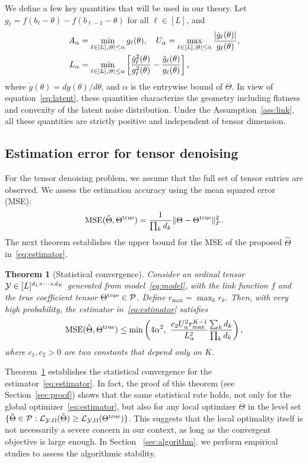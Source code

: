 \documentclass[11pt]{article}
\theoremstyle{plain}
\newtheorem{thm}{Theorem}[section]
\theoremstyle{definition}
\begin{document}
We define a few key quantities that will be used in our theory. Let $g_\ell=f(b_\ell-\theta)-f(b_{\ell-1}-\theta)$ for all $\ell\in[L]$, and
\begin{align}\label{eq:regular}
A_\alpha &= \min_{\ell\in[L], |\theta|\leq \alpha} g_\ell(\theta),\quad  U_\alpha=\max_{\ell\in[L], |\theta|\leq \alpha } {|\dot{g}_\ell(\theta)|\over g_\ell(\theta)},\\
 L_\alpha &= \min_{\ell\in[L], |\theta|\leq \alpha }\left[{\dot{g}_\ell^2 (\theta)\over g_\ell^2(\theta)} -{\ddot{g}_\ell(\theta)\over g_\ell(\theta)}\right],
\end{align}
where $\dot{g}(\theta)=dg(\theta)/d\theta$, and $\alpha$ is the entrywise bound of $\Theta$. In view of equation~\eqref{eq:latent}, these quantities characterize the geometry including flatness and convexity of the latent noise distribution. Under the Assumption~\ref{ass:link}, all these quantities are strictly positive and independent of tensor dimension.

\subsection{Estimation error for tensor denoising}\label{sec:denosing}
For the tensor denoising problem, we assume that the full set of tensor entries are observed. We assess the estimation accuracy using the mean squared error (MSE):
\[
\text{MSE}(\hat \Theta, \Theta^{\mathrm{true}})={1\over \prod_k d_k}\lVert\Theta-\Theta^{\mathrm{true}}\rVert_F^2.
\]
The next theorem establishes the upper bound for the MSE of the proposed $\hat \Theta$ in~\eqref{eq:estimator}.

\begin{thm}[Statistical convergence] \label{thm:rate}
Consider an ordinal tensor $\mathcal{Y}\in[L]^{d_1\times\dots\times d_K}$ generated from model~\eqref{eq:model}, with the link function $f$ and the true coefficient tensor $\Theta^{\mathrm{true}}\in\mathcal{P}$. Define $r_{\max}=\max_k r_k$. Then, with very high probability, the estimator in~\eqref{eq:estimator} satisfies
\begin{equation}\label{eq:rate}
\text{MSE}(\hat \Theta, \trueT) \leq \min\left( 4\alpha^2,\ {c_2  U^2_\alpha r_{\max}^{K-1}  \over  L^2_\alpha } {\sum_kd_k\over  \prod_k d_k} \right),
\end{equation}
where $c_1, c_2>0$ are two constants that depend only on $K$.
\end{thm}
Theorem~\ref{thm:rate} establishes the statistical convergence for the estimator~\eqref{eq:estimator}. In fact, the proof of this theorem (see Section~\ref{sec:proof}) shows that the same statistical rate holds, not only for the global optimizer~\eqref{eq:estimator}, but also for any local optimizer $\check \Theta$ in the level set $\{\check\Theta\in\mathcal{P}: \mathcal{L}_{\mathcal{Y},\Omega}(\check\Theta)\geq \mathcal{L}_{\mathcal{Y},\Omega}(\Theta^{\mathrm{true}})\}$. This suggests that the local optimality itself is not necessarily a severe concern in our context, as long as the convergent objective is large enough. In Section ~\ref{sec:algorithm}, we perform empirical studies to assess the algorithmic stability.
\end{document}
